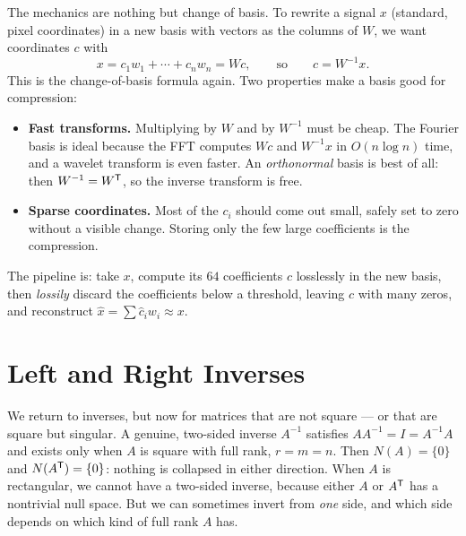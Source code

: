 The mechanics are nothing but change of basis. To rewrite a signal $x$ (standard, pixel coordinates) in a new basis with vectors as the columns of $W$, we want coordinates $c$ with
\[
   x = c_1 w_1 + \cdots + c_n w_n = Wc,
   \qquad\text{so}\qquad
   c = W^{-1}x .
\]
This is the change-of-basis formula again. Two properties make a basis good for compression:
\begin{itemize}
   \item \textbf{Fast transforms.} Multiplying by $W$ and by $W^{-1}$ must be cheap. The Fourier basis is ideal because the FFT computes $Wc$ and $W^{-1}x$ in $O(n\log n)$ time, and a wavelet transform is even faster. An \emph{orthonormal} basis is best of all: then $W^{-1}=W^{\mathsf T}$, so the inverse transform is free.
   \item \textbf{Sparse coordinates.} Most of the $c_i$ should come out small, safely set to zero without a visible change. Storing only the few large coefficients is the compression.
\end{itemize}
The pipeline is: take $x$, compute its $64$ coefficients $c$ losslessly in the new basis, then \emph{lossily} discard the coefficients below a threshold, leaving $\hat c$ with many zeros, and reconstruct $\hat x=\sum \hat c_i w_i\approx x$.


\section{Left and Right Inverses}

We return to inverses, but now for matrices that are not square --- or that are square but singular. A genuine, two-sided inverse $A^{-1}$ satisfies $AA^{-1}=I=A^{-1}A$ and exists only when $A$ is square with full rank, $r=m=n$. Then $N(A)=\{0\}$ and $N(A^{\mathsf T})=\{0\}$: nothing is collapsed in either direction. When $A$ is rectangular, we cannot have a two-sided inverse, because either $A$ or $A^{\mathsf T}$ has a nontrivial null space. But we can sometimes invert from \emph{one} side, and which side depends on which kind of full rank $A$ has.


